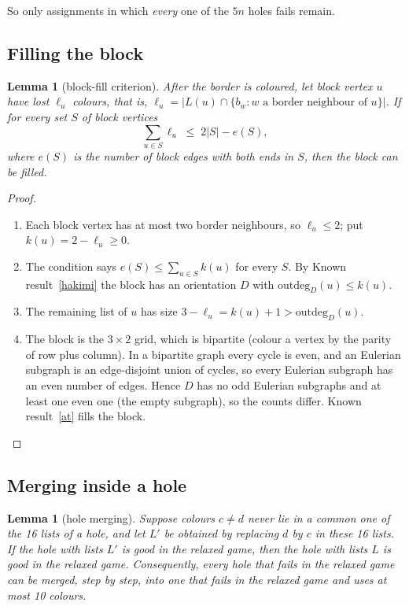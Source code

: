 \documentclass[11pt]{article}
\theoremstyle{plain}
\newtheorem{lemma}[theorem]{Lemma}
\theoremstyle{definition}
\theoremstyle{remark}
\newenvironment{steps}[1][]{\begin{enumerate}[label=\textbf{Step \arabic*.},leftmargin=4.4em,itemsep=0.35em,#1]}{\end{enumerate}}
\begin{document}
So only assignments in which \emph{every} one of the $5n$ holes fails remain.

\subsection{Filling the block}

\begin{lemma}[block-fill criterion]\label{blockfill}
After the border is coloured, let block vertex $u$ have lost $\ell_u$ colours, that is,
$\ell_u = |L(u) \cap \{b_w : w \text{ a border neighbour of } u\}|$. If for every set $S$ of block vertices
\[ \textstyle\sum_{u \in S} \ell_u \;\le\; 2|S| - e(S), \]
where $e(S)$ is the number of block edges with both ends in $S$, then the block can be filled.
\end{lemma}

\begin{proof}
\begin{steps}
\item Each block vertex has at most two border neighbours, so $\ell_u \le 2$; put $k(u) = 2 - \ell_u \ge 0$.
\item The condition says $e(S) \le \sum_{u \in S} k(u)$ for every $S$. By Known result~\ref{hakimi} the block has an
orientation $D$ with $\mathrm{outdeg}_D(u) \le k(u)$.
\item The remaining list of $u$ has size $3 - \ell_u = k(u) + 1 > \mathrm{outdeg}_D(u)$.
\item The block is the $3 \times 2$ grid, which is bipartite (colour a vertex by the parity of row plus column). In a bipartite
graph every cycle is even, and an Eulerian subgraph is an edge-disjoint union of cycles, so every Eulerian subgraph has an
even number of edges. Hence $D$ has no odd Eulerian subgraphs and at least one even one (the empty subgraph), so the counts
differ. Known result~\ref{at} fills the block. \qedhere
\end{steps}
\end{proof}

\subsection{Merging inside a hole}

\begin{lemma}[hole merging]\label{holemerge}
Suppose colours $c \ne d$ never lie in a common one of the 16 lists of a hole, and let $L'$ be obtained by replacing $d$ by
$c$ in these 16 lists. If the hole with lists $L'$ is good in the relaxed game, then the hole with lists $L$ is good in the
relaxed game. Consequently, every hole that fails in the relaxed game can be merged, step by step, into one that fails in
the relaxed game and uses at most 10 colours.
\end{lemma}
\end{document}
